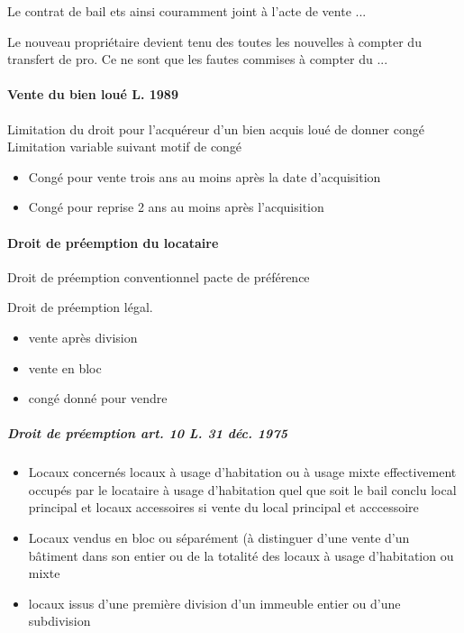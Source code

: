 \documentclass[10pt,a4paper,twoside]{article}
\begin{document}
			Le contrat de bail ets ainsi couramment joint à l'acte de vente ...

			Le nouveau propriétaire devient tenu des toutes les nouvelles à compter du transfert de pro. Ce ne sont que les fautes commises à compter du ...

			\paragraph{Vente du bien loué L. 1989}

				Limitation du droit pour l’acquéreur d’un bien acquis loué de
				donner congé Limitation variable suivant motif de congé
				\begin{itemize}
					\item Congé pour vente trois ans au moins après la date
					d’acquisition

					\item Congé pour reprise 2 ans au moins après l’acquisition
				\end{itemize}


			\paragraph{Droit de préemption du locataire}

				Droit de préemption conventionnel pacte de préférence

				Droit de préemption légal.
				\begin{itemize}
					\item vente après division
					\item vente en bloc
					\item congé donné pour vendre
				\end{itemize}

				\subparagraph{Droit de préemption art. 10 L. 31 déc. 1975}

					\begin{itemize}
						\item Locaux concernés locaux à usage d’habitation ou à usage
						mixte effectivement occupés par le locataire à usage
						d’habitation quel que soit le bail conclu local principal et
						locaux accessoires si vente du local principal et acccessoire
						\item Locaux vendus en bloc ou séparément (à distinguer d’une
						vente d’un bâtiment dans son entier ou de la totalité des locaux
						à usage d’habitation ou mixte
						\item locaux issus d’une première division d’un immeuble entier ou
						d’une subdivision
					\end{itemize}
\end{document}
